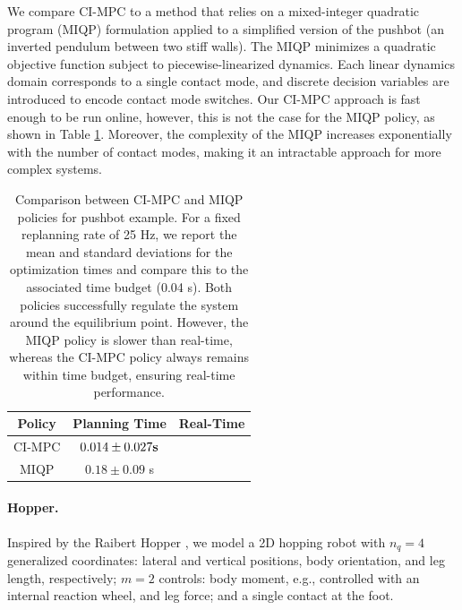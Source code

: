 We compare CI-MPC to a method that relies on a mixed-integer quadratic program (MIQP) formulation \cite{bemporad1999control} applied to a simplified version of the pushbot (an inverted pendulum between two stiff walls). The MIQP minimizes a quadratic objective function subject to piecewise-linearized dynamics. Each linear dynamics domain corresponds to a single contact mode, and discrete decision variables are introduced to encode contact mode switches. Our CI-MPC approach is fast enough to be run online, however, this is not the case for the MIQP policy, as shown in Table \ref{cipc_pushbot_results}. Moreover, the complexity of the MIQP increases exponentially with the number of contact modes, making it an intractable approach for more complex systems. 

\begin{table}[H]
	\centering
	\caption[Numerical comparison between CI-MPC and MIQP policies for pushbot push recovery]{Comparison between CI-MPC and MIQP policies for pushbot example. For a fixed replanning rate of 25 Hz, we report the mean and standard deviations for the optimization times and compare this to the associated time budget (0.04 s). Both policies successfully regulate the system around the equilibrium point. However, the MIQP policy is slower than real-time, whereas the CI-MPC policy always remains within time budget, ensuring real-time performance.}
	
	\begin{tabular}{c c c}
		\toprule
		\textbf{Policy} &
		\textbf{Planning Time} &
		\textbf{Real-Time} \\
		\toprule
		CI-MPC & \boldmath $0.014 \pm 0.027 \mbox{\textbf{s}}$ \unboldmath & \checkmark \\ 
		MIQP   & $0.18  \pm 0.09$ s & \ding{53} \\ 
		\toprule
	\end{tabular}
	\label{cipc_pushbot_results}
\end{table}

\paragraph{Hopper.}
Inspired by the Raibert Hopper \cite{raibert1989dynamically}, we model a 2D hopping robot with $n_q = 4$ generalized coordinates: lateral and vertical positions, body orientation, and leg length, respectively; $m = 2$ controls: body moment, e.g., controlled with an internal reaction wheel, and leg force; and a single contact at the foot. 


